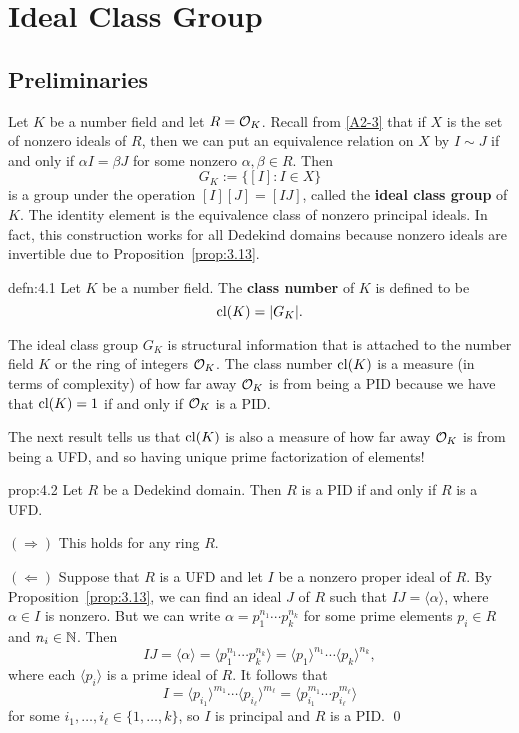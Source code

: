\section{Ideal Class Group}\label{sec:4}

\subsection{Preliminaries}\label{subsec:4.1}
Let $K$ be a number field and let $R = {\cal O}_K$. Recall from 
\ref{A2-3} that if $X$ is the set of nonzero ideals of $R$, then we can put 
an equivalence relation on $X$ by $I \sim J$ if and only if $\alpha I = \beta J$ 
for some nonzero $\alpha, \beta \in R$. Then 
\[ G_K := \{[I] : I \in X\} \] 
is a group under the operation $[I][J] = [IJ]$, called the {\bf ideal 
class group} of $K$. The identity element is the equivalence class 
of nonzero principal ideals. In fact, this construction works for 
all Dedekind domains because nonzero ideals are invertible due to 
Proposition~\ref{prop:3.13}.

\begin{defn}{defn:4.1}
    Let $K$ be a number field. The {\bf class number} of $K$ is defined to be 
    \[ \operatorname{cl}(K) = |G_K|. \] 
\end{defn}\vspace{-0.25cm}

The ideal class group $G_K$ is structural information that is attached to 
the number field $K$ or the ring of integers ${\cal O}_K$. The class 
number $\operatorname{cl}(K)$ is a measure (in terms of complexity) of how far away 
${\cal O}_K$ is from being a PID because we have that $\operatorname{cl}(K) = 1$ 
if and only if ${\cal O}_K$ is a PID. 

The next result tells us that $\operatorname{cl}(K)$ is also a measure of how far away
${\cal O}_K$ is from being a UFD, and so having unique prime factorization 
of elements!

\begin{prop}{prop:4.2}
    Let $R$ be a Dedekind domain. Then $R$ is a PID if and only if $R$ is a UFD.
\end{prop}\vspace{-0.25cm}
\begin{pf}
    $(\Rightarrow)$ This holds for any ring $R$. 

    $(\Leftarrow)$ Suppose that $R$ is a UFD and let $I$ be a nonzero proper ideal 
    of $R$. By Proposition~\ref{prop:3.13}, we can find an ideal $J$ of $R$ 
    such that $IJ = \langle \alpha \rangle$, where $\alpha \in I$ is nonzero. 
    But we can write $\alpha = p_1^{n_1} \cdots p_k^{n_k}$ for some 
    prime elements $p_i \in R$ and $n_i \in \mathbb{N}$. Then 
    \[ IJ = \langle \alpha \rangle = \langle p_1^{n_1} \cdots p_k^{n_k} \rangle 
    = \langle p_1 \rangle^{n_1} \cdots \langle p_k \rangle^{n_k}, \] 
    where each $\langle p_i \rangle$ is a prime ideal of $R$. It follows that 
    \[ I = \langle p_{i_1} \rangle^{m_1} \cdots \langle p_{i_\ell} \rangle^{m_\ell} 
    = \langle p_{i_1}^{m_1} \cdots p_{i_\ell}^{m_\ell} \rangle \] 
    for some $i_1, \dots, i_\ell \in \{1, \dots, k\}$, so $I$ 
    is principal and $R$ is a PID. \qed 
\end{pf}\vspace{-0.25cm}

